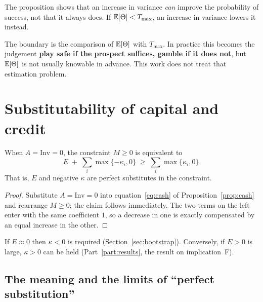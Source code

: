 \begin{remark}
\label{rem:deadline-limit}
The proposition shows that an increase in variance \emph{can} improve the probability of success,
not that it always does. If $\mathbb{E}[\Theta]<T_{\max}$, an increase in variance lowers it instead.

The boundary is the comparison of $\mathbb{E}[\Theta]$ with $T_{\max}$. In practice this becomes the
judgement \textbf{play safe if the prospect suffices, gamble if it does not}, but $\mathbb{E}[\Theta]$ is
not usually knowable in advance. This work does not treat that estimation problem.
\end{remark}

\section{Substitutability of capital and credit}

\begin{proposition}
\label{prop:substitution}
When $A=\mathrm{Inv}=0$, the constraint $M\geq 0$ is equivalent to
\begin{equation}
E \;+\; \sum_i \max\{-\kappa_i,0\} \;\geq\; \sum_i \max\{\kappa_i,0\} .
\end{equation}
That is, $E$ and negative $\kappa$ are perfect substitutes in the constraint.
\end{proposition}

\begin{proof}
Substitute $A=\mathrm{Inv}=0$ into equation~\eqref{eq:cash} of Proposition~\ref{prop:cash} and
rearrange $M\geq 0$; the claim follows immediately. The two terms on the left enter with the same
coefficient $1$, so a decrease in one is exactly compensated by an equal increase in the other.
\end{proof}

\begin{corollary}
If $E\approx 0$ then $\kappa<0$ is required (Section~\ref{sec:bootstrap}). Conversely, if $E>0$
is large, $\kappa>0$ can be held (Part~\ref{part:results}, the result on implication~F).
\end{corollary}

\subsection{The meaning and the limits of ``perfect substitution''}

